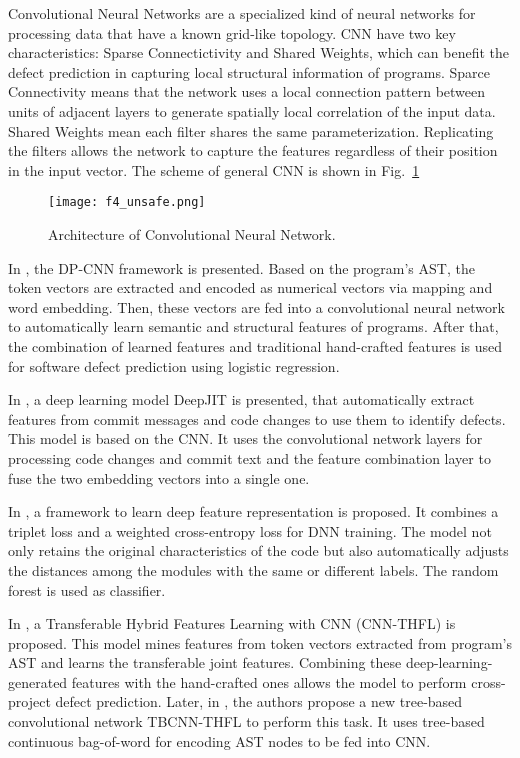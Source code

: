 \documentclass{article}
\begin{document}
Convolutional Neural Networks are a specialized kind of neural networks for processing data that have a known grid-like topology. CNN have two key characteristics: Sparse Connectictivity and Shared Weights, which can benefit the defect prediction in capturing local structural information of programs. Sparce Connectivity means that the network uses a local connection pattern between units of adjacent layers to generate spatially local correlation of the input data. Shared Weights mean each filter shares the same parameterization. Replicating the filters allows the network to capture the features regardless of their position in the input vector. The scheme of general CNN is shown in Fig.~\ref{fig4}

\begin{figure}[ht] %
\centering
\texttt{[image: f4\_unsafe.png]}
\caption{ Architecture of Convolutional Neural Network.}
\label{fig4} %
\end{figure}

In \cite{LiEtAl2017}, the DP-CNN framework is presented. Based on the program's AST, the token vectors are extracted and encoded as numerical vectors via mapping and word embedding. Then, these vectors are fed into a convolutional neural network to automatically learn semantic and structural features of programs. After that, the combination of learned features and traditional hand-crafted features is used for software defect prediction using logistic regression.

In \cite{HoangEtAl2019}, a deep learning model DeepJIT is presented, that automatically extract features from commit messages and code changes to use them to identify defects. This model is based on the CNN. It uses the convolutional network layers for processing code changes and commit text and the feature combination layer to fuse the two embedding vectors into a single one.

In \cite{XuEtAl2019}, a framework to learn deep feature representation is proposed. It combines a triplet loss and a weighted cross-entropy loss for DNN training. The model not only retains the original characteristics of the code but also automatically adjusts the distances among the modules with the same or different labels. The random forest is used as classifier.

In \cite{QiuLuCaiJiang2019}, a Transferable Hybrid Features Learning with CNN (CNN-THFL) is proposed. This model mines features from token vectors extracted from program's AST and learns the transferable joint features. Combining these deep-learning-generated features with the hand-crafted ones allows the model to perform cross-project defect prediction. Later, in \cite{CaiLuQiu2019}, the authors propose a new tree-based convolutional network TBCNN-THFL to perform this task. It uses tree-based continuous bag-of-word for encoding AST nodes to be fed into CNN.
\end{document}
